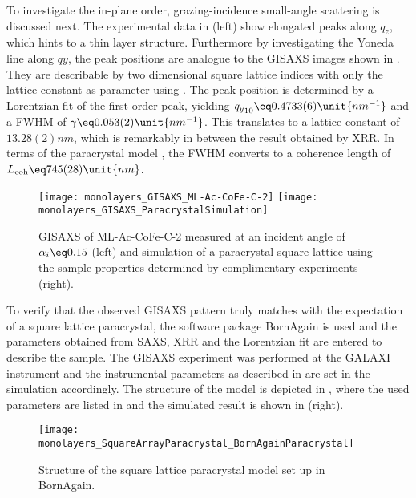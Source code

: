\documentclass[\main/dresen_thesis.tex]{subfiles}
\begin{document}
  To investigate the in-plane order, grazing-incidence small-angle scattering is discussed next.
  The experimental data in  (left) show elongated peaks along $\mathit{q_z}$, which hints to a thin layer structure.
  Furthermore by investigating the Yoneda line along $\mathit{qy}$, the peak positions are analogue to the GISAXS images shown in .
  They are describable by two dimensional square lattice indices with only the lattice constant as parameter using .
  The peak position is determined by a Lorentzian fit of the first order peak, yielding $\mathit{q_y}_{10} \eq 0.4733(6) \unit{nm^{-1}}$ and a FWHM of $\gamma \eq 0.053(2) \unit{nm^{-1}}$.
  This translates to a lattice constant of $13.28(2) \unit{nm}$, which is remarkably in between the result obtained by XRR.
  In terms of the paracrystal model , the FWHM converts to a coherence length of $L_{\mathrm{coh}} \eq 745(28) \unit{nm}$.
  \begin{figure}[tb]
    \centering
    \texttt{[image: monolayers\_GISAXS\_ML-Ac-CoFe-C-2]}
    \texttt{[image: monolayers\_GISAXS\_ParacrystalSimulation]}
    \caption{\label{fig:monolayers:structure:ML-Ac-CoFe-C-2:GISAXS}GISAXS of ML-Ac-CoFe-C-2 measured at an incident angle of $\alpha_i \eq 0.15$ (left) and simulation of a paracrystal square lattice using the sample properties determined by complimentary experiments (right).}
  \end{figure}

  To verify that the observed GISAXS pattern truly matches with the expectation of a square lattice paracrystal, the software package BornAgain \cite{Burle_2018_borna} is used and the parameters obtained from SAXS, XRR and the Lorentzian fit are entered to describe the sample.
  The GISAXS experiment was performed at the GALAXI instrument and the instrumental parameters as described in  are set in the simulation accordingly.
  The structure of the model is depicted in , where the used parameters are listed in  and the simulated result is shown in  (right).

  \begin{figure}[tb]
    \centering
    \texttt{[image: monolayers\_SquareArrayParacrystal\_BornAgainParacrystal]}
    \caption{\label{fig:monolayers:structure:BornAgainParacrystal}Structure of the square lattice paracrystal model set up in BornAgain.}
  \end{figure}
\end{document}
